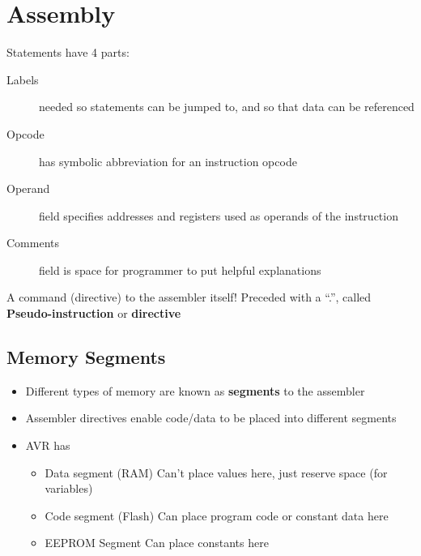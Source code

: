\section{Assembly}
Statements have 4 parts:
\begin{description}
	\item[Labels] needed so statements can be jumped to, and so that data can be referenced
	\item[Opcode] has symbolic abbreviation for an instruction opcode
	\item[Operand] field specifies addresses and registers used as operands of the instruction
	\item[Comments] field is space for programmer to put helpful explanations
\end{description}
A command (directive) to the assembler itself! Preceded with a ``.'', called \textbf{Pseudo-instruction} or \textbf{directive}

\subsection{Memory Segments}
\begin{itemize}
	\item Different types of memory are known as \textbf{segments} to the assembler
	\item Assembler directives enable code/data to be placed into different segments
	\item AVR has
	\begin{itemize}
		\item Data segment (RAM)
		\subitem Can't place values here, just reserve space (for variables)
		\item Code segment (Flash)
		\subitem Can place program code or constant data here
		\item EEPROM Segment	
		\subitem Can place constants here
	\end{itemize}
\end{itemize}


